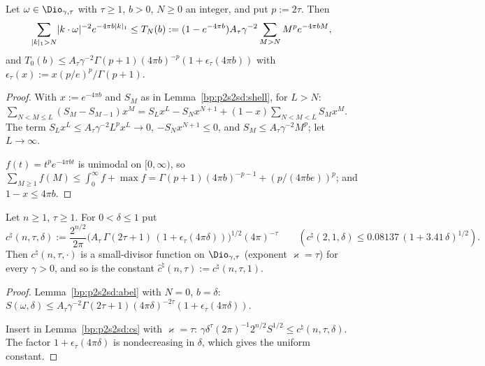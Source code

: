 \begin{lemma}\label{bp:p2s2sd:abel}
Let $\omega\in\Dio_{\gamma,\tau}$ with $\tau\ge1$, $b>0$, $N\ge0$ an integer, and put $p:=2\tau$. Then
\[
\sum_{\lvert k\rvert_1>N}\lvert k\cdot\omega\rvert^{-2}e^{-4\pi b\lvert k\rvert_1}\le T_N(b):=(1-e^{-4\pi b})A_\tau\gamma^{-2}\sum_{M>N}M^{p}e^{-4\pi bM},
\]
and $T_0(b)\le A_\tau\gamma^{-2}\Gamma(p+1)(4\pi b)^{-p}(1+\epsilon_\tau(4\pi b))$ with $\epsilon_\tau(x):=x(p/e)^p/\Gamma(p+1)$.
\end{lemma}

\begin{proof}
\label{step:p2s2sd:ab-parts}
With $x:=e^{-4\pi b}$ and $S_M$ as in Lemma~\ref{bp:p2s2sd:shell}, for $L>N$:
$\sum_{N<M\le L}(S_M-S_{M-1})x^M=S_Lx^{L}-S_Nx^{N+1}+(1-x)\sum_{N<M<L}S_Mx^M$. The term $S_Lx^L\le A_\tau\gamma^{-2}L^px^L\to0$,
$-S_Nx^{N+1}\le0$, and $S_M\le A_\tau\gamma^{-2}M^p$; let $L\to\infty$.

\label{step:p2s2sd:ab-full}
$f(t)=t^pe^{-4\pi bt}$ is unimodal on $[0,\infty)$, so $\sum_{M\ge1}f(M)\le\int_0^\infty f+\max f=\Gamma(p+1)(4\pi b)^{-p-1}+(p/(4\pi be))^p$;
and $1-x\le4\pi b$.
\end{proof}

\begin{proposition}\label{bp:p2s2sd:classical}
Let $n\ge1$, $\tau\ge1$. For $0<\delta\le1$ put
\[
c^\natural(n,\tau,\delta):=\frac{2^{n/2}}{2\pi}\bigl(A_\tau\,\Gamma(2\tau+1)\,(1+\epsilon_\tau(4\pi\delta))\bigr)^{1/2}(4\pi)^{-\tau}
\qquad(c^\natural(2,1,\delta)\le0.08137\,(1+3.41\,\delta)^{1/2}).
\]
Then $c^\natural(n,\tau,\cdot)$ is a small-divisor function on $\Dio_{\gamma,\tau}$ (exponent $\varkappa=\tau$) for every $\gamma>0$, and so is the
constant $\hat c^\natural(n,\tau):=c^\natural(n,\tau,1)$.
\end{proposition}

\begin{proof}
\label{step:p2s2sd:cl-sum}
Lemma~\ref{bp:p2s2sd:abel} with $N=0$, $b=\delta$: $S(\omega,\delta)\le A_\tau\gamma^{-2}\Gamma(2\tau+1)(4\pi\delta)^{-2\tau}(1+\epsilon_\tau(4\pi\delta))$.

\label{step:p2s2sd:cl-c}
Insert in Lemma~\ref{bp:p2s2sd:cs} with $\varkappa=\tau$: $\gamma\delta^\tau(2\pi)^{-1}2^{n/2}S^{1/2}\le c^\natural(n,\tau,\delta)$. The factor
$1+\epsilon_\tau(4\pi\delta)$ is nondecreasing in $\delta$, which gives the uniform constant.
\end{proof}

